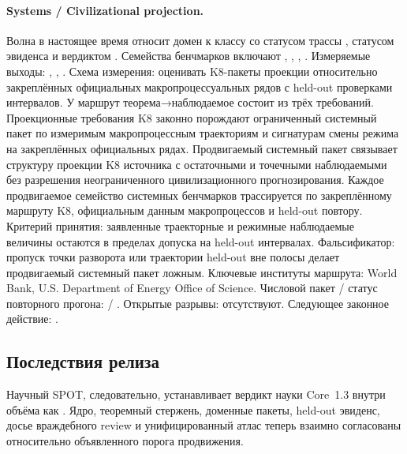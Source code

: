 \paragraph{Systems / Civilizational projection.}
Волна  в настоящее время относит домен к классу  со статусом трассы , статусом эвиденса  и вердиктом .
Семейства бенчмарков включают , \allowbreak {}, \allowbreak {}, \allowbreak {}.
Измеряемые выходы: , \allowbreak {}, \allowbreak {}.
Схема измерения: оценивать K8-пакеты проекции относительно закреплённых официальных макропроцессуальных рядов с held-out проверками интервалов.
У маршрут теорема→наблюдаемое состоит из трёх требований. Проекционные требования K8 законно порождают ограниченный системный пакет по измеримым макропроцессным траекториям и сигнатурам смены режима на закреплённых официальных рядах. Продвигаемый системный пакет связывает структуру проекции K8 источника с остаточными и точечными наблюдаемыми без разрешения неограниченного цивилизационного прогнозирования. Каждое продвигаемое семейство системных бенчмарков трассируется по закреплённому маршруту K8, официальным данным макропроцессов и held-out повтору.
Критерий принятия: заявленные траекторные и режимные наблюдаемые величины остаются в пределах допуска на held-out интервалах.
Фальсификатор: пропуск точки разворота или траектории held-out вне полосы делает продвигаемый системный пакет ложным.
Ключевые институты маршрута: World Bank, \allowbreak U.S. Department of Energy Office of Science.
Числовой пакет / статус повторного прогона:  / .
Открытые разрывы: отсутствуют.
Следующее законное действие: .

\subsection{Последствия релиза}
Научный SPOT, следовательно, устанавливает вердикт науки Core~1.3 внутри объёма  как .
Ядро, теоремный стержень, доменные пакеты, held-out эвиденс, досье враждебного review и унифицированный атлас теперь взаимно согласованы относительно объявленного порога продвижения.

